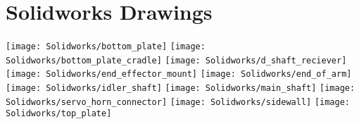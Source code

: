 \section{Solidworks Drawings}
\label{app:SolidworksDrawings}
\centering
\texttt{[image: Solidworks/bottom\_plate]} \newpage
\texttt{[image: Solidworks/bottom\_plate\_cradle]} \newpage
\texttt{[image: Solidworks/d\_shaft\_reciever]} \newpage
\texttt{[image: Solidworks/end\_effector\_mount]} \newpage
\texttt{[image: Solidworks/end\_of\_arm]} \newpage
\texttt{[image: Solidworks/idler\_shaft]} \newpage
\texttt{[image: Solidworks/main\_shaft]} \newpage
\texttt{[image: Solidworks/servo\_horn\_connector]} \newpage
\texttt{[image: Solidworks/sidewall]} \newpage
\texttt{[image: Solidworks/top\_plate]} \newpage
